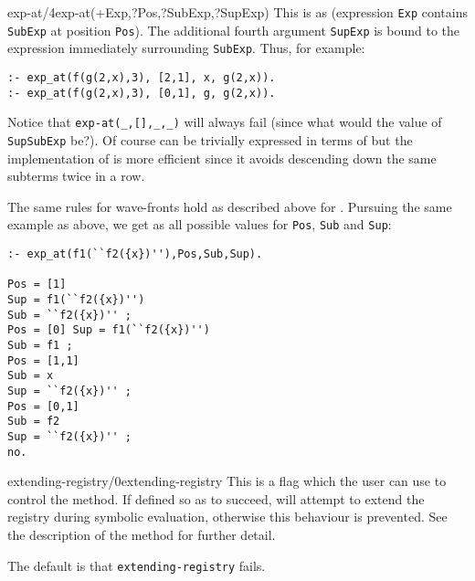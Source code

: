 \begin{predicate}{exp-at/4}{exp-at(+Exp,?Pos,?SubExp,?SupExp)}%
This is as  (expression {\tt Exp} contains {\tt SubExp} at
position {\tt Pos}). The additional fourth argument {\tt SupExp} is
bound to the expression immediately surrounding {\tt SubExp}. Thus,
for example:
\begin{verbatim}
:- exp_at(f(g(2,x),3), [2,1], x, g(2,x)).
:- exp_at(f(g(2,x),3), [0,1], g, g(2,x)).
\end{verbatim}
Notice that {\tt exp-at(\_,[],\_,\_)} will always fail (since what
would the value of {\tt SupSubExp} be?). Of course  can be
trivially expressed in terms of  but the implementation of
 is more efficient since it avoids descending down the
same subterms twice in a row.

\sloppypar The same rules for wave-fronts hold as described above for
. Pursuing the same example as above, we get as all
possible values for {\tt Pos}, {\tt Sub} and {\tt Sup}:
\begin{verbatim}
:- exp_at(f1(``f2({x})''),Pos,Sub,Sup).

Pos = [1]
Sup = f1(``f2({x})'')
Sub = ``f2({x})'' ;
Pos = [0] Sup = f1(``f2({x})'')
Sub = f1 ;
Pos = [1,1]
Sub = x
Sup = ``f2({x})'' ;
Pos = [0,1]
Sub = f2
Sup = ``f2({x})'' ;
no.
\end{verbatim}
\end{predicate}

\begin{predicate}{extending-registry/0}{extending-registry}%
This is a flag which the user can use to control the 
method.  If defined so as to succeed,  will attempt to
extend the registry during symbolic evaluation, otherwise this
behaviour is prevented.  See the description of the 
method for further detail.

The default is that {\tt extending-registry} fails.
\end{predicate}

